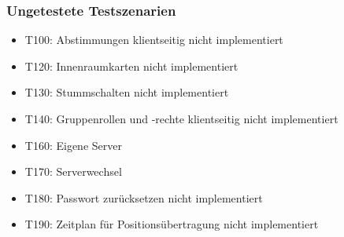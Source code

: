 \documentclass[parskip=full,11pt]{scrartcl}
\begin{document}
	\subsubsection{Ungetestete Testszenarien}
	\begin{itemize}
        \item T100: Abstimmungen klientseitig nicht implementiert
		\item T120: Innenraumkarten nicht implementiert
		\item T130: Stummschalten nicht implementiert
		\item T140: Gruppenrollen und -rechte klientseitig nicht implementiert
		\item T160: Eigene Server %
		\item T170: Serverwechsel %
		\item T180: Passwort zurücksetzen nicht implementiert
		\item T190: Zeitplan für Positionsübertragung nicht implementiert
	\end{itemize}
\end{document}
